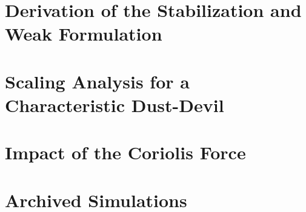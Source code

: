 \documentclass[draft,utopia,12pt]{report}    %
\theoremstyle{definition}
\theoremstyle{remark}
\begin{document}
%

\appendices

\chapter{Derivation of the Stabilization and Weak Formulation}


\chapter{Scaling Analysis for a Characteristic Dust-Devil}


\chapter{Impact of the Coriolis Force}


%

%

\chapter{Archived Simulations}

\end{document}
